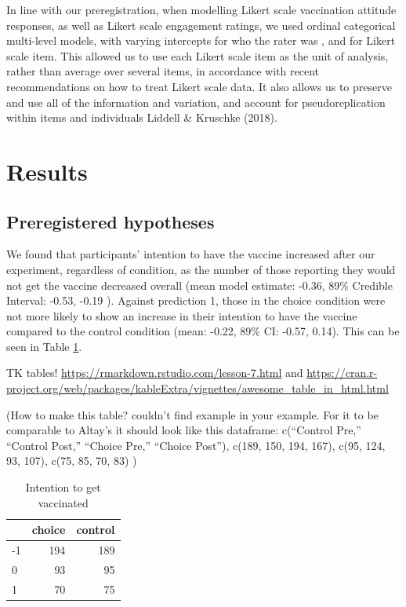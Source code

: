 \documentclass[
  english,
  ,jou,floatsintext]{apa6}
\begin{document}
In line with our preregistration, when modelling Likert scale vaccination attitude responses, as well as Likert scale engagement ratings, we used ordinal categorical multi-level models, with varying intercepts for who the rater was , and for Likert scale item. This allowed us to use each Likert scale item as the unit of analysis, rather than average over several items, in accordance with recent recommendations on how to treat Likert scale data. It also allows us to preserve and use all of the information and variation, and account for pseudoreplication within items and individuals Liddell \& Kruschke (2018).

\hypertarget{results}{%
\section{Results}\label{results}}

\hypertarget{preregistered-hypotheses-1}{%
\subsection{Preregistered hypotheses}\label{preregistered-hypotheses-1}}

We found that participants' intention to have the vaccine increased after our experiment, regardless of condition, as the number of those reporting they would not get the vaccine decreased overall (mean model estimate: -0.36, 89\% Credible Interval: -0.53, -0.19 ). Against prediction 1, those in the choice condition were not more likely to show an increase in their intention to have the vaccine compared to the control condition (mean: -0.22, 89\% CI: -0.57, 0.14). This can be seen in Table \ref{tab:intchange}.

TK tables! \url{https://rmarkdown.rstudio.com/lesson-7.html} and \url{https://cran.r-project.org/web/packages/kableExtra/vignettes/awesome_table_in_html.html}

(How to make this table? couldn't find example in your example. For it to be comparable to Altay's it should look like this dataframe: c(``Control Pre,'' ``Control Post,'' ``Choice Pre,'' ``Choice Post''), c(189, 150, 194, 167), c(95, 124, 93, 107), c(75, 85, 70, 83) )

\begin{table}

\caption{\label{tab:intchange}Intention to get vaccinated}
\centering
\begin{tabular}[t]{l|r|r}
\hline
  & choice & control\\
\hline
-1 & 194 & 189\\
\hline
0 & 93 & 95\\
\hline
1 & 70 & 75\\
\hline
\end{tabular}
\end{table}
\end{document}
